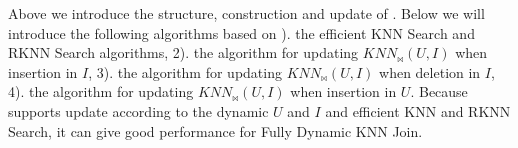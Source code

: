 Above we introduce the structure, construction and update of \dualtree. Below we will introduce the following algorithms based on ). the efficient KNN Search and RKNN Search algorithms, 2). the algorithm for updating $KNN_{\bowtie}(U,I)$ when insertion in $I$, 3). the algorithm for updating $KNN_{\bowtie}(U,I)$ when deletion in $I$, 4). the algorithm for updating $KNN_{\bowtie}(U,I)$ when insertion in $U$. Because \dualtree supports update according to the dynamic $U$ and $I$ and efficient KNN and RKNN Search, it can give good performance for Fully Dynamic KNN Join.

